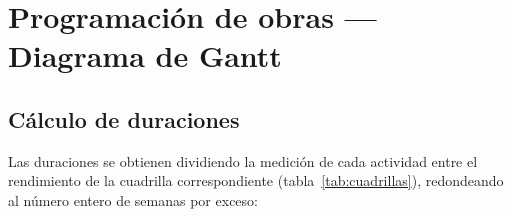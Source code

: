 \section{Programación de obras — Diagrama de Gantt}
\label{sec:muro_gantt}

\subsection{Cálculo de duraciones}
\label{subsec:duraciones}

Las duraciones se obtienen dividiendo la medición de cada actividad entre
el rendimiento de la cuadrilla correspondiente (tabla~\ref{tab:cuadrillas}),
redondeando al número entero de semanas por exceso:

